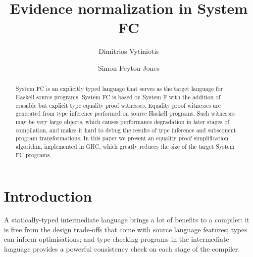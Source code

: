 \documentclass[a4paper,UKenglish]{lipics}
\title{Evidence normalization in System FC}
\author{Dimitrios Vytiniotis}
\author{Simon Peyton Jones}
\affil{Microsoft Research, Cambridge}
\begin{document}
 













\maketitle
\makeatactive

\begin{abstract}
System FC is an explicitly typed language that serves as the target language for Haskell
source programs. System FC is based on System F with the addition of erasable but explicit type equality
proof witnesses. Equality proof witnesses are generated from type inference performed on source Haskell
programs. Such witnesses may be very large objects, which causes performance degradation in later stages of 
compilation, and makes it hard to debug the results of type inference and subsequent program transformations.
In this paper we present an equality proof simplification algorithm, implemented in GHC, which greatly reduces 
the size of the target System FC programs.
\end{abstract}

\section{Introduction}\label{s:intro}

A statically-typed intermediate language brings a lot of benefits to a compiler: it is free 
from the design trade-offs that come with source language features; types
can inform optimisations; and type checking
programs in the intermediate language provides a powerful consistency check on 
each stage of the compiler.
\end{document}
